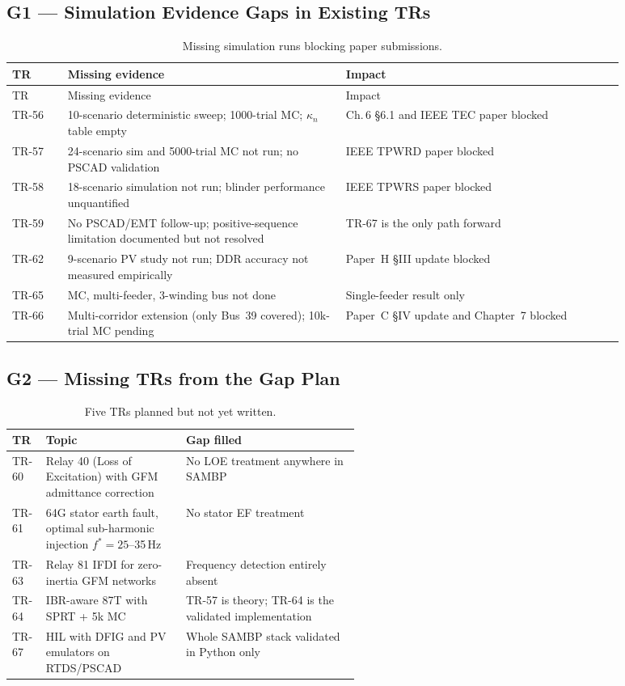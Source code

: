 \documentclass[12pt,a4paper]{article}
\newcommand{\kn}{\kappa_n}
\begin{document}
\subsection{G1 — Simulation Evidence Gaps in Existing TRs}

\begin{longtable}{p{0.08\linewidth}p{0.40\linewidth}p{0.40\linewidth}}
\caption{Missing simulation runs blocking paper submissions.}\label{tab:g1}\\
\toprule
TR & Missing evidence & Impact \\
\midrule\endfirsthead
\toprule
TR & Missing evidence & Impact \\\midrule\endhead
TR-56 & 10-scenario deterministic sweep; 1000-trial MC; $\kn$ table empty & Ch.\,6 §6.1 and IEEE TEC paper blocked \\
TR-57 & 24-scenario sim and 5000-trial MC not run; no PSCAD validation & IEEE TPWRD paper blocked \\
TR-58 & 18-scenario simulation not run; blinder performance unquantified & IEEE TPWRS paper blocked \\
TR-59 & No PSCAD/EMT follow-up; positive-sequence limitation documented but not resolved & TR-67 is the only path forward \\
TR-62 & 9-scenario PV study not run; DDR accuracy not measured empirically & Paper~H §III update blocked \\
TR-65 & MC, multi-feeder, 3-winding bus not done & Single-feeder result only \\
TR-66 & Multi-corridor extension (only Bus~39 covered); 10k-trial MC pending & Paper~C §IV update and Chapter~7 blocked \\
\bottomrule
\end{longtable}

\subsection{G2 — Missing TRs from the Gap Plan}

\begin{table}[H]
\centering
\caption{Five TRs planned but not yet written.}
\begin{tabular}{llp{0.50\linewidth}}
\toprule
TR & Topic & Gap filled \\
\midrule
TR-60 & Relay 40 (Loss of Excitation) with GFM admittance correction & No LOE treatment anywhere in SAMBP \\
TR-61 & 64G stator earth fault, optimal sub-harmonic injection $f^* = 25$--35\,Hz & No stator EF treatment \\
TR-63 & Relay 81 IFDI for zero-inertia GFM networks & Frequency detection entirely absent \\
TR-64 & IBR-aware 87T with SPRT + 5k MC & TR-57 is theory; TR-64 is the validated implementation \\
TR-67 & HIL with DFIG and PV emulators on RTDS/PSCAD & Whole SAMBP stack validated in Python only \\
\bottomrule
\end{tabular}
\end{table}
\end{document}
